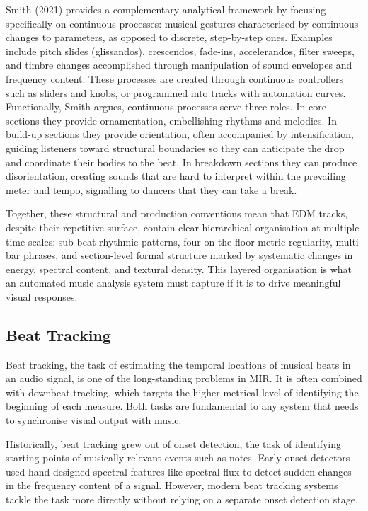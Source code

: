 Smith (2021) provides a complementary analytical framework by focusing specifically on continuous processes: musical gestures characterised by continuous changes to parameters, as opposed to discrete, step-by-step ones. Examples include pitch slides (glissandos), crescendos, fade-ins, accelerandos, filter sweeps, and timbre changes accomplished through manipulation of sound envelopes and frequency content. These processes are created through continuous controllers such as sliders and knobs, or programmed into tracks with automation curves. Functionally, Smith argues, continuous processes serve three roles. In core sections they provide ornamentation, embellishing rhythms and melodies. In build-up sections they provide orientation, often accompanied by intensification, guiding listeners toward structural boundaries so they can anticipate the drop and coordinate their bodies to the beat. In breakdown sections they can produce disorientation, creating sounds that are hard to interpret within the prevailing meter and tempo, signalling to dancers that they can take a break.\cite{smith2021functions}   

Together, these structural and production conventions mean that EDM tracks, despite their repetitive surface, contain clear hierarchical organisation at multiple time scales: sub-beat rhythmic patterns, four-on-the-floor metric regularity, multi-bar phrases, and section-level formal structure marked by systematic changes in energy, spectral content, and textural density. This layered organisation is what an automated music analysis system must capture if it is to drive meaningful visual responses.

\subsection{Beat Tracking}

Beat tracking, the task of estimating the temporal locations of musical beats in an audio signal, is one of the long-standing problems in MIR.\cite{foscarin2024beatthis}  It is often combined with downbeat tracking, which targets the higher metrical level of identifying the beginning of each measure.  Both tasks are fundamental to any system that needs to synchronise visual output with music.

Historically, beat tracking grew out of onset detection, the task of identifying starting points of musically relevant events such as notes.  Early onset detectors used hand-designed spectral features like spectral flux to detect sudden changes in the frequency content of a signal. However, modern beat tracking systems tackle the task more directly without relying on a separate onset detection stage.\cite{hendrikpurwins20191}   


